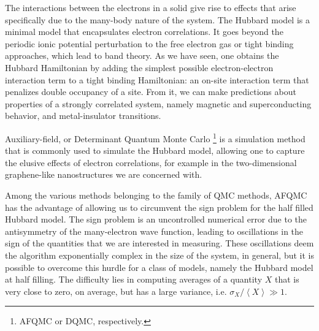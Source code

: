 
\label{cap:afqmc}

\slshape

The interactions between the electrons in a solid give rise to effects that arise specifically due to the many-body nature of the system. The Hubbard model is a minimal model that encapsulates electron correlations. It goes beyond the periodic ionic potential perturbation to the free electron gas or tight binding approaches, which lead to band theory. As we have seen, one obtains the Hubbard Hamiltonian by adding the simplest possible electron-electron interaction term to a tight binding Hamiltonian: an on-site interaction term that penalizes double occupancy of a site. From it, we can make predictions about properties of a strongly correlated system, namely magnetic and superconducting behavior, and metal-insulator transitions.

Auxiliary-field, or Determinant Quantum Monte Carlo \footnote{AFQMC or DQMC, respectively.} is a simulation method that is commonly used to simulate the Hubbard model, allowing one to capture the elusive effects of electron correlations, for example in the two-dimensional graphene-like nanostructures we are concerned with.

Among the various methods belonging to the family of QMC methods, AFQMC has the advantage of  allowing us to circumvent the sign problem for the half filled Hubbard model. The sign problem is an uncontrolled numerical error due to the antisymmetry of the many-electron wave function, leading to oscillations in the sign of the quantities that we are interested in measuring. These oscillations deem the algorithm exponentially complex in the size of the system, in general, but it is possible to overcome this hurdle for a class of models, namely the Hubbard model at half filling. The difficulty lies in computing averages of a quantity $X$ that is very close to zero, on average, but has a large variance, i.e. $\sigma_X / \left\langle X \right\rangle \gg 1$.

\normalfont


\cleardoublepage
